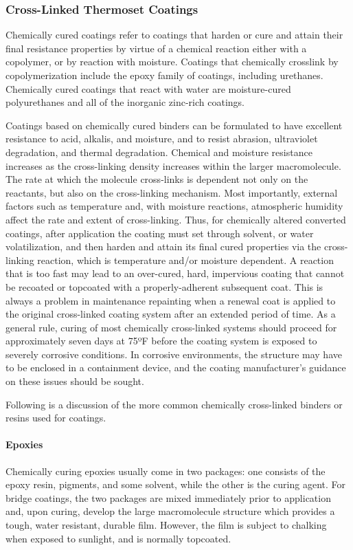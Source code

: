 \subsubsection{Cross-Linked Thermoset Coatings}
Chemically cured coatings refer to coatings that harden or cure and attain their final resistance properties by
virtue of a chemical reaction either with a copolymer, or by reaction with moisture. Coatings that chemically crosslink
by copolymerization include the epoxy family of coatings, including urethanes. Chemically cured coatings that
react with water are moisture-cured polyurethanes and all of the inorganic zinc-rich coatings.

Coatings based on chemically cured binders can be formulated to have excellent resistance to acid, alkalis, and
moisture, and to resist abrasion, ultraviolet degradation, and thermal degradation. Chemical and moisture resistance
increases as the cross-linking density increases within the larger macromolecule. The rate at which the molecule
cross-links is dependent not only on the reactants, but also on the cross-linking mechanism. Most importantly,
external factors such as temperature and, with moisture reactions, atmospheric humidity affect the rate and extent of
cross-linking. Thus, for chemically altered converted coatings, after application the coating must set through solvent,
or water volatilization, and then harden and attain its final cured properties via the cross-linking reaction, which is
temperature and/or moisture dependent. A reaction that is too fast may lead to an over-cured, hard, impervious
coating that cannot be recoated or topcoated with a properly-adherent subsequent coat. This is always a problem in
maintenance repainting when a renewal coat is applied to the original cross-linked coating system after an extended
period of time. As a general rule, curing of most chemically cross-linked systems should proceed for approximately
seven days at 75ºF before the coating system is exposed to severely corrosive conditions. In corrosive environments,
the structure may have to be enclosed in a containment device, and the coating manufacturer’s guidance on these
issues should be sought.

Following is a discussion of the more common chemically cross-linked binders or resins used for coatings.

\paragraph{Epoxies}
Chemically curing epoxies usually come in two packages: one consists of the epoxy resin, pigments, and some
solvent, while the other is the curing agent. For bridge coatings, the two packages are mixed immediately prior to
application and, upon curing, develop the large macromolecule structure which provides a tough, water resistant,
durable film. However, the film is subject to chalking when exposed to sunlight, and is normally topcoated.

